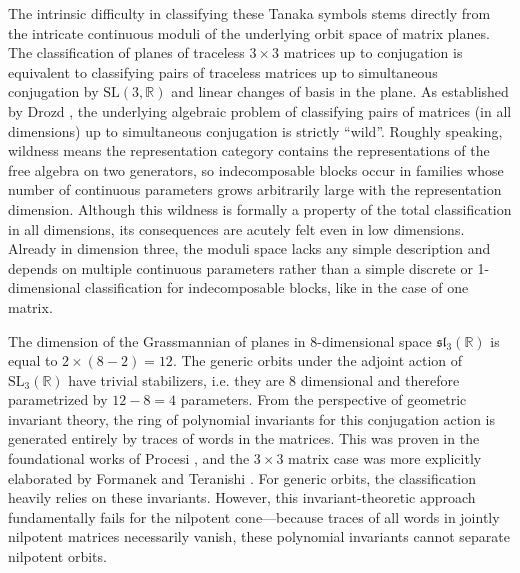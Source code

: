 \documentclass[11pt,letterpaper]{amsart}
\numberwithin{equation}{section}
\begin{document}
The intrinsic difficulty in classifying these Tanaka symbols stems directly from the intricate continuous moduli of the underlying orbit space of matrix planes. The classification of planes of traceless $3\times 3$ matrices up to conjugation is equivalent to classifying pairs of traceless matrices up to simultaneous conjugation by $\mathrm{SL}(3,\mathbb{R})$ and linear changes of basis in the plane. As established by Drozd \cite{Drozd1979, Drozd1980}, the underlying algebraic problem of classifying pairs of matrices (in all dimensions) up to simultaneous conjugation is strictly ``wild''. 
Roughly speaking, wildness means the representation category contains the representations of the free algebra on two generators, so indecomposable blocks occur in families whose number of continuous parameters grows arbitrarily large with the representation dimension. Although this wildness is formally a property of the total classification in all dimensions, its consequences are acutely felt even in low dimensions. Already in dimension three, the moduli space lacks any simple description and depends on multiple continuous parameters rather than a simple discrete or 1-dimensional classification for indecomposable blocks, like in the case of one matrix.

The dimension of the Grassmannian of planes in $8$-dimensional space $\mathfrak{sl}_3(\mathbb R)$ is equal to $2\times (8-2)=12$. The generic orbits under the adjoint action of $\mathrm {SL}_3(\mathbb R)$ have trivial stabilizers, i.e. they are 8 dimensional and therefore parametrized by $12-8=4$ parameters. From the perspective of geometric invariant theory, the ring of polynomial invariants for this conjugation action is generated entirely by traces of words in the matrices. This was proven in the foundational works of Procesi \cite{Procesi1976}, and the $3\times 3$ matrix case was more explicitly elaborated by Formanek \cite{Formanek1979} and Teranishi \cite{Teranishi1986}. For generic orbits, the classification heavily relies on these invariants.
However, this invariant-theoretic approach fundamentally fails for the nilpotent cone---because traces of all words in jointly nilpotent matrices necessarily vanish, these polynomial invariants cannot separate nilpotent orbits. 
\end{document}
